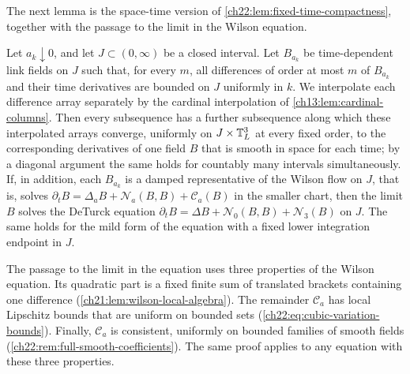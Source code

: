The next lemma is the space-time version of \cref{ch22:lem:fixed-time-compactness}, together with the passage to the limit in the Wilson equation.

\begin{lemma}\label{ch22:lem:array-compactness}
Let $a_k\downarrow0$, and let $J\subset(0,\infty)$ be a closed interval. Let $B_{a_k}$ be time-dependent link fields on $J$ such that, for every $m$, all differences of order at most $m$ of $B_{a_k}$ and their time derivatives are bounded on $J$ uniformly in $k$. We interpolate each difference array separately by the cardinal interpolation of \cref{ch13:lem:cardinal-columns}. Then every subsequence has a further subsequence along which these interpolated arrays converge, uniformly on $J\times\mathbb T_L^3$ at every fixed order, to the corresponding derivatives of one field $B$ that is smooth in space for each time; by a diagonal argument the same holds for countably many intervals simultaneously. If, in addition, each $B_{a_k}$ is a damped representative of the Wilson flow on $J$, that is, solves $\partial_tB=\Delta_aB+\mathcal N_a(B,B)+\mathscr C_a(B)$ in the smaller chart, then the limit $B$ solves the DeTurck equation $\partial_tB=\Delta B+\mathcal N_0(B,B)+\mathscr N_3(B)$ on $J$. The same holds for the mild form of the equation with a fixed lower integration endpoint in $J$.
\end{lemma}

The passage to the limit in the equation uses three properties of the Wilson equation. Its quadratic part is a fixed finite sum of translated brackets containing one difference (\cref{ch21:lem:wilson-local-algebra}). The remainder $\mathscr C_a$ has local Lipschitz bounds that are uniform on bounded sets (\eqref{ch22:eq:cubic-variation-bounds}). Finally, $\mathscr C_a$ is consistent, uniformly on bounded families of smooth fields (\cref{ch22:rem:full-smooth-coefficients}). The same proof applies to any equation with these three properties.

